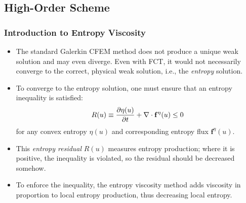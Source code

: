 \documentclass{beamer} \useoutertheme{infolines}
\begin{document}
\subsection{High-Order Scheme}
\begin{frame}
\frametitle{Introduction to Entropy Viscosity}

\begin{itemize}
   \item The standard Galerkin CFEM method does not produce a unique weak
      solution and may even diverge. Even with
      FCT, it would not necessarily converge to the correct, physical
      weak solution, i.e., the \emph{entropy} solution.
   \item To converge to the entropy solution, one must ensure that an entropy
      inequality is satisfied:
      \begin{equation}
         R(u) \equiv \frac{\partial \eta(u)}{\partial t} + \nabla\cdot\mathbf{f}^\eta(u) \leq 0
      \end{equation}
      for any convex entropy $\eta(u)$ and corresponding entropy flux
      $\mathbf{f}^\eta(u)$.
   \item This \emph{entropy residual} $R(u)$ measures entropy production;
      where it is positive, the inequality is violated, so the residual
      should be decreased somehow.
   \item To enforce the inequality, the entropy viscosity method adds
      viscosity in proportion to local entropy production, thus decreasing
      local entropy.
\end{itemize}

\end{frame}
\end{document}
